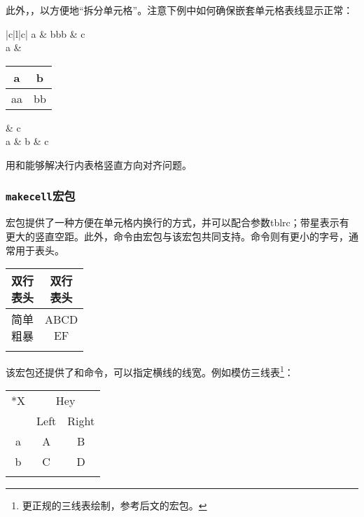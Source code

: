 此外，，以方便地“拆分单元格”。注意下例中如何确保嵌套单元格表线显示正常：

\begin{codeshow}
\begin{tabular}{|c|l|c|}
\hline
a & bbb & c \\ \hline
a & 
{\begin{tabular}{c|c}
a & b \\ \hline
aa & bb \\
\end{tabular}}
& c \\ \hline
a & b & c \\ \hline
\end{tabular}
\end{codeshow}

用和能够解决行内表格竖直方向对齐问题。

\subsubsection{\texttt{makecell}宏包}
宏包提供了一种方便在单元格内换行的方式，并可以配合参数tblrc；带星表示有更大的竖直空距。此外，命令由宏包与该宏包共同支持。命令则有更小的字号，通常用于表头。
\begin{codeshow}
\begin{tabular}{|c|c|}
\hline
\thead{双行\\表头} & \thead{双行\\表头}\\
\hline
\multirowcell{2}{简单\\粗暴} & \makecell[l]{ABCD\\EF} \\
\cline{2-2} & \makecell*{更大的竖直空距} \\
\hline
\end{tabular}
\end{codeshow}

该宏包还提供了和命令，可以指定横线的线宽。例如模仿三线表\footnote{更正规的三线表绘制，参考后文的宏包。}：
\begin{codeshow}
\begin{tabular}{ccc}
\Xhline{2pt}
\multirow{2}*{X} & 
\multicolumn{2}{c}{Hey}\\
\Xcline{2-3}{0.4pt}
& Left & Right \\
\Xhline{1pt} 
a & A & B \\
b & C & D \\
\Xhline{2pt}
\end{tabular}
\end{codeshow}

